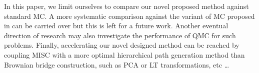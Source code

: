 In this paper, we limit ourselves to compare our novel proposed method against standard MC. A more systematic comparison against the variant of MC proposed in \cite{mccrickerd2017turbocharging}  can be carried over but this is left for a future work. Another  eventual direction of research may also investigate the performance of QMC for such problems. Finally, accelerating  our novel designed method can be reached  by coupling MISC with a more optimal hierarchical path generation method than Brownian bridge construction, such as PCA or LT transformations, etc \dots